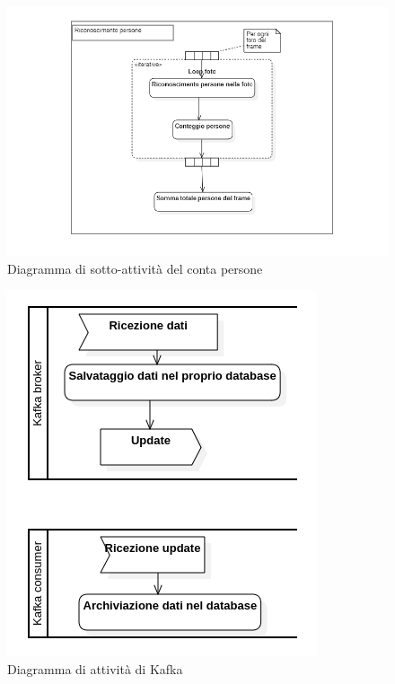 \begin{figure}[!h]
  \begin{center}
    \includegraphics[width=1\linewidth]{../immagini/diag_PB/conta_persone.png}
    \caption{Diagramma di sotto-attività del conta persone}
  \end{center}
\end{figure}
\begin{figure}[!h]
  \begin{center}
    \includegraphics[width=1\linewidth]{../immagini/diag_PB/kafka.png}
    \caption{Diagramma di attività di Kafka}
  \end{center}
\end{figure}


